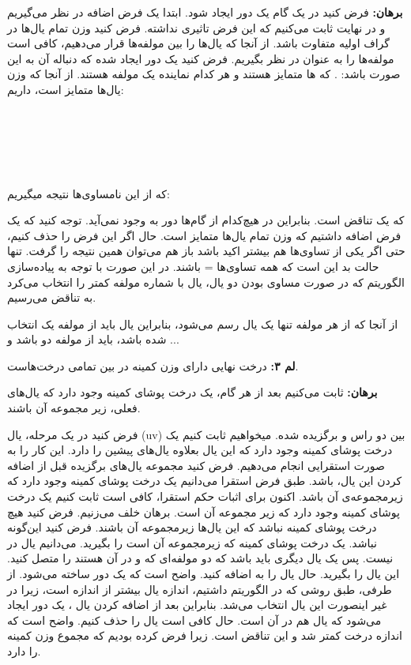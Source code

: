 \documentclass[11pt, oneside]{article}
\begin{document}
\textbf{برهان:}
فرض کنید در یک گام یک دور ایجاد شود. ابتدا یک فرض اضافه در نظر می‌گیریم و در نهایت ثابت می‌کنیم که این فرض تاثیری نداشته. فرض کنید وزن تمام یال‌ها در گراف اولیه متفاوت باشد.
از آنجا که یال‌ها را بین مولفه‌ها قرار می‌دهیم، کافی است مولفه‌ها را به عنوان  در نظر بگیریم. فرض کنید یک دور ایجاد شده که دنباله آن به این صورت باشد: . که ها متمایز هستند و هر کدام نماینده یک مولفه‌ هستند. از آنجا که وزن یال‌ها متمایز است، داریم:
\\
\\
\\
\\
\\
\\

که از این نامساوی‌ها نتیجه میگیریم:


که یک تناقض است. بنابراین در هیچ‌کدام از گام‌ها دور به وجود نمی‌آید. توجه کنید که یک فرض اضافه داشتیم که وزن تمام یال‌ها متمایز است. حال اگر این فرض را حذف کنیم، حتی اگر یکی از تساوی‌ها هم بیشتر اکید باشد باز هم می‌توان همین نتیجه را گرفت. تنها حالت بد این است که همه تساوی‌ها = باشند. در این صورت با توجه به پیاده‌سازی الگوریتم که در صورت مساوی بودن دو یال، یال  با شماره مولفه کمتر را انتخاب می‌کرد به تناقض می‌رسیم.


از آنجا که از هر مولفه تنها یک یال رسم می‌شود، بنابراین یال  باید از مولفه یک انتخاب شده باشد،  باید از مولفه دو باشد و ...

\textbf{لم ۳:}
درخت نهایی دارای وزن کمینه در بین تمامی درخت‌هاست.

\textbf{برهان:}
ثابت می‌کنیم بعد از هر گام، یک درخت پوشای کمینه وجود دارد که یال‌های فعلی، زیر مجموعه آن باشند.

فرض کنید در یک مرحله، یال \lr(uv) بین دو راس  و  برگزیده شده.
میخواهیم ثابت کنیم یک درخت پوشای کمینه وجود دارد که این یال بعلاوه یال‌های پیشین را دارد. این کار را به صورت استقرایی انجام می‌دهیم.
فرض کنید مجموعه یال‌های برگزیده قبل از اضافه کردن این یال،  باشد. طبق فرض استقرا می‌دانیم یک درخت پوشای کمینه وجود دارد که  زیرمجموعه‌ی آن باشد.
اکنون برای اثبات حکم استقرا، کافی است ثابت کنیم یک درخت پوشای کمینه وجود دارد که 
 زیر مجموعه آن است.
برهان خلف می‌زنیم. فرض کنید هیچ درخت پوشای کمینه نباشد که این یال‌ها زیرمجموعه آن باشند.
فرض کنید این‌گونه نباشد. یک درخت پوشای کمینه که  زیرمجموعه آن است را  بگیرید. می‌دانیم یال  در  نیست.
پس یک یال دیگری باید باشد که دو مولفه‌ای که  و  در آن هستند را متصل کنید. این یال را  بگیرید. حال یال  را به  اضافه کنید.
واضح است که یک دور ساخته می‌شود.
از طرفی، طبق روشی که در الگوریتم داشتیم، اندازه یال  بیشتر از اندازه  است، زیرا در غیر اینصورت این یال انتخاب می‌شد. بنابراین بعد از اضافه کردن یال ، یک دور ایجاد می‌شود که یال  هم در آن است. حال کافی است یال  را حذف کنیم. واضح است که اندازه درخت کمتر شد و این تناقض است. زیرا فرض کرده بودیم که  مجموع وزن کمینه را دارد.
\end{document}
